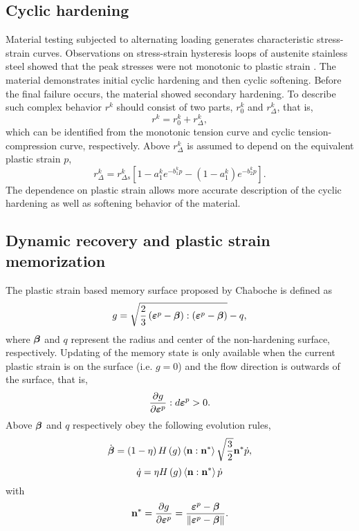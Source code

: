 \documentclass[preprint,5p,twocolumn,11pt,sort&compress]{elsarticle}
\newcommand{\bfepsilon}{{\mbox{\boldmath{$\varepsilon$}}}}
\newcommand{\bfbeta}{{\mbox{\boldmath{$\beta$}}}}
\newcommand{\bfn}{{\bf n}}
\begin{document}
\subsection{Cyclic hardening}
Material testing subjected to alternating loading generates characteristic stress-strain curves. Observations on stress-strain hysteresis loops of austenite stainless steel showed that the peak stresses were not monotonic to plastic strain \cite{fang2015cyclic}. The material demonstrates initial cyclic hardening and then cyclic softening. Before the final failure occurs, the material showed secondary hardening. To describe such complex behavior $r^k$ should consist of two parts, $r_0^k$ and $r_{\Delta}^k$, that is,
\begin{equation}
\label{Equ:rk1}
{r^k} = r_0^k + r_\Delta ^k,
\end{equation}
which can be identified from the monotonic tension curve and cyclic tension-compression curve, respectively.
Above $r_\Delta ^k$ is assumed to depend on the equivalent plastic strain $p$,
\begin{equation}
\label{Equ:rdeltak1}
r_\Delta ^k = r_{\Delta s}^k\left[ {1 - a_1^k{e^{ - b_1^kp}} - (1-a_1^k){e^{ - b_2^kp}} }\right].
\label{Equ:rdeltak}
\end{equation}
The dependence on plastic strain allows more accurate description of the cyclic hardening as well as softening behavior of the material.

\subsection{Dynamic recovery and plastic strain memorization}
The plastic strain based memory surface proposed by Chaboche \cite{Chaboche1986149} is defined as
\begin{equation}
\label{Equ:g1}
g = \sqrt {\frac{2}{3}\left( {{\bfepsilon^p} - \bfbeta} \right):\left( {{\bfepsilon^p} - \bfbeta} \right)}  - q,
\end{equation}
where $\bfbeta$ and $q$ represent the radius and center of the non-hardening surface, respectively.
Updating of the memory state is only available when the current plastic strain is on the surface (i.e. $g=0$) and the flow direction is outwards of the surface, that is,
\[
\frac{{\partial g}}{{\partial {\bfepsilon^p}}}:d{\bfepsilon^p} > 0.
\]
Above $\bfbeta$ and $q$ respectively obey the following evolution rules,
\begin{equation}
\label{Equ:dotbeta1}
\dot\bfbeta  = \left( {1 - \eta } \right)H\left( g \right)\left\langle {\bfn:{\bfn^*}} \right\rangle \sqrt {\frac{3}{2}} {\bfn^*}\dot p,
\end{equation}
\begin{equation}
\label{Equ:dotq1}
\dot q = \eta H\left( g \right)\left\langle {\bfn:{\bfn^*}} \right\rangle \dot p
\end{equation}
with
\begin{equation}
\label{Equ:nstar}
{\bfn^*} = \frac{{\partial g}}{{\partial {\bfepsilon^p}}} = \frac{{{\bfepsilon^p} - \bfbeta}}{{\left\| {{\bfepsilon^p} - \bfbeta} \right\|}}.
\end{equation}
\end{document}
